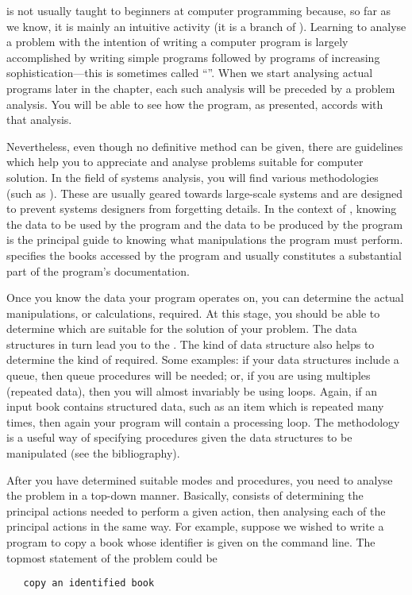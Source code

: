  is not usually taught to
beginners at computer programming because, so far as we know, it is
mainly an intuitive activity (it is a branch of ).
Learning to analyse a problem with the intention of writing a
computer program is largely accomplished by writing simple programs
followed by programs of increasing sophistication---this is sometimes
called ``''.  When we start analysing actual
programs later in the chapter, each such analysis will be preceded by
a problem analysis.  You will be able to see how the program, as
presented, accords with that analysis.

Nevertheless, even though no definitive method can be given, there are
guidelines which help you to appreciate and analyse problems suitable
for computer solution. In the field of systems analysis, you will find
various methodologies (such as ). These are usually
geared towards large-scale systems and are designed to prevent systems
designers from forgetting details.  In the context of
, knowing the data to be used by
the program and the data to be produced by the program is the principal
guide to knowing what manipulations the program must perform.
 specifies the books accessed by
the program and usually constitutes a substantial part of the program's
documentation.

Once you know the data your program operates on, you can determine
the actual manipulations, or calculations, required. At this stage,
you should be able to determine which
 are suitable for the solution of
your problem.  The data structures in turn lead you to the
.  The kind of data structure also helps to
determine the kind of  required.  Some
examples: if your data structures include a queue, then queue
procedures will be needed; or, if you are using multiples (repeated
data), then you will almost invariably be using loops.  Again, if an
input book contains structured data, such as an item which is
repeated many times, then again your program will contain a
processing loop.  The 
methodology is a useful way of specifying procedures given the data
structures to be manipulated (see the bibliography).

After you have determined suitable modes and procedures, you need to
analyse the problem in a top-down manner.  Basically,
 consists of determining the principal
actions needed to perform a given action, then analysing each of the
principal actions in the same way.  For example, suppose we wished to
write a program to copy a book whose identifier is given on the
command line.  The topmost statement of the problem could be
\begin{verbatim}
   copy an identified book
\end{verbatim}

